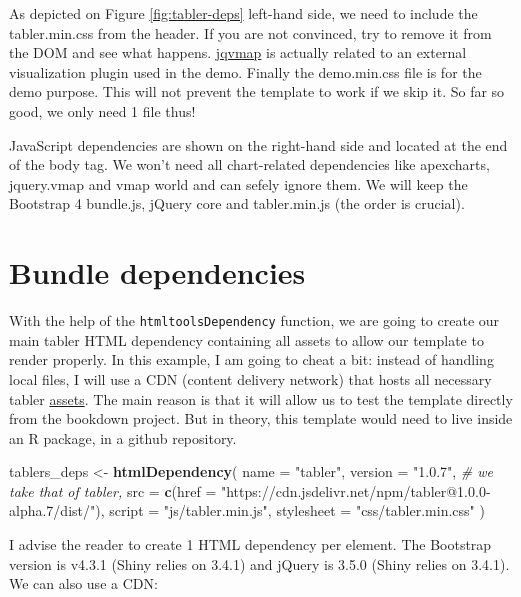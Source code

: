 \documentclass[]{book}
\newenvironment{Shaded}{\begin{snugshade}}{\end{snugshade}}
\newcommand{\CommentTok}[1]{\textcolor[rgb]{0.56,0.35,0.01}{\textit{#1}}}
\newcommand{\DataTypeTok}[1]{\textcolor[rgb]{0.13,0.29,0.53}{#1}}
\newcommand{\KeywordTok}[1]{\textcolor[rgb]{0.13,0.29,0.53}{\textbf{#1}}}
\newcommand{\NormalTok}[1]{#1}
\newcommand{\StringTok}[1]{\textcolor[rgb]{0.31,0.60,0.02}{#1}}
\begin{document}
As depicted on Figure \ref{fig:tabler-deps} left-hand side, we need to include the tabler.min.css from the header. If you are not convinced, try to remove it from the DOM and see what happens. \href{https://www.10bestdesign.com/jqvmap/}{jqvmap} is actually related to an external visualization plugin used in the demo. Finally the demo.min.css file is for the demo purpose. This will not prevent the template to work if we skip it. So far so good, we only need 1 file thus!

JavaScript dependencies are shown on the right-hand side and located at the end of the body tag. We won't need all chart-related dependencies like apexcharts, jquery.vmap and vmap world and can sefely ignore them. We will keep the Bootstrap 4 bundle.js, jQuery core and tabler.min.js (the order is crucial).

\hypertarget{bundle-dependencies}{%
\section{Bundle dependencies}\label{bundle-dependencies}}

With the help of the \texttt{htmltoolsDependency} function, we are going to create our main tabler HTML dependency containing all assets to allow our template to render properly. In this example, I am going to cheat a bit: instead of handling local files, I will use a CDN (content delivery network) that hosts all necessary tabler \href{https://www.jsdelivr.com/package/npm/tabler}{assets}. The main reason is that it will allow us to test the template directly from the bookdown project. But in theory, this template would need to live inside an R package, in a github repository.

\begin{Shaded}
\begin{Highlighting}[]
\NormalTok{tablers_deps <-}\StringTok{ }\KeywordTok{htmlDependency}\NormalTok{(}
  \DataTypeTok{name =} \StringTok{"tabler"}\NormalTok{,}
  \DataTypeTok{version =} \StringTok{"1.0.7"}\NormalTok{, }\CommentTok{# we take that of tabler,}
  \DataTypeTok{src =} \KeywordTok{c}\NormalTok{(}\DataTypeTok{href =} \StringTok{"https://cdn.jsdelivr.net/npm/tabler@1.0.0-alpha.7/dist/"}\NormalTok{),}
  \DataTypeTok{script =} \StringTok{"js/tabler.min.js"}\NormalTok{,}
  \DataTypeTok{stylesheet =} \StringTok{"css/tabler.min.css"}
\NormalTok{)}
\end{Highlighting}
\end{Shaded}

I advise the reader to create 1 HTML dependency per element. The Bootstrap version is v4.3.1 (Shiny relies on 3.4.1) and jQuery is 3.5.0 (Shiny relies on 3.4.1). We can also use a CDN:
\end{document}
